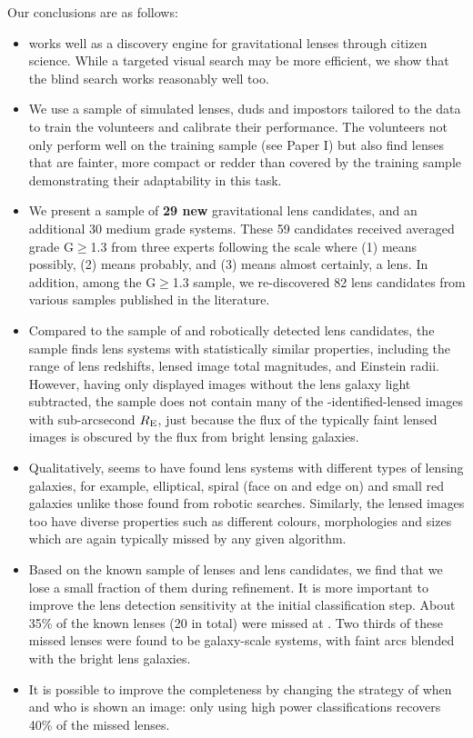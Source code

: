 \documentclass[useAMS,usenatbib,a4paper]{mn2e}
\begin{document}
Our conclusions are as follows:
\begin{itemize}
\item \sw works well as a discovery engine for gravitational lenses
through citizen science. While a targeted visual search may be more
efficient, we show that the blind search works reasonably well too.

\item We use a sample of simulated lenses, duds and impostors tailored
to the \cfhtls data to train the volunteers and calibrate their
performance. The volunteers not only perform well on the training sample
(see Paper I) but also find lenses that are fainter, more compact or
redder than covered by the training sample demonstrating their
adaptability in this task. 

\item We present a sample of {\bf 29 new} gravitational lens candidates,
and an additional 30 medium grade systems. These 59 candidates received
averaged grade G$\ge$1.3 from three experts following the scale where
(1) means possibly, (2) means probably, and (3) means almost certainly,
a lens. In addition, among the G$\ge$1.3 sample, we re-discovered 82
lens candidates from various samples published in the literature.

\item Compared to the sample of \rf and \af robotically detected lens
candidates, the \sw sample finds lens systems with statistically similar
properties, including the range of lens redshifts, lensed image total
magnitudes, and Einstein radii. However, having only displayed images
without the lens galaxy light subtracted, the \sw sample does not
contain many of the \rf-identified-lensed images with sub-arcsecond
$R_{\rm E}$, just because the flux of the typically faint lensed images
is obscured by the flux from bright lensing galaxies.

\item Qualitatively, \sw seems to have found lens systems with different
types of lensing galaxies, for example, elliptical, spiral (face on and
edge on) and small red galaxies unlike those found from robotic
searches. Similarly, the lensed images too have diverse properties such
as different colours, morphologies and sizes which are again typically
missed by any given algorithm.

\item Based on the known sample of lenses and lens candidates, we find
that we lose a small fraction of them during \StageTwo refinement.  It
is more important to improve the lens detection sensitivity at the
initial \StageOne classification step.  About 35\% of the known lenses
(20 in total) were missed at \StageOne.  Two thirds of these missed
lenses were found to be galaxy-scale \rf systems, with faint arcs
blended with the bright lens galaxies.

\item It is possible to improve the \sw completeness by
changing the strategy of when and who is shown an image: only using high power
classifications recovers 40\% of the missed lenses.

\end{itemize}
\end{document}
